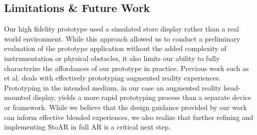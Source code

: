 \subsection{Limitations \& Future Work}
Our high fidelity prototype used a simulated store display rather than a real world environment.  While this approach allowed us to conduct a preliminary evaluation of the prototype application without the added complexity of instrumentation or physical obstacles, it also limits our ability to fully characterize the affordances of our prototype in practice. Previous work such as et al. \cite{macintyre2004dart} deals with effectively prototyping augmented reality experiences. Prototyping in the intended medium, in our case an augmented reality head-mounted display, yields a more rapid prototyping process than a separate device or framework. 
While we believe that the design guidance provided by our work can inform effective blended experiences, we also realize that further refining and implementing StoAR in full AR is a critical next step. 

